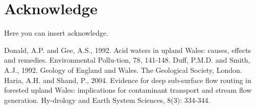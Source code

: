 \documentclass[12pt,a4paper,twocolumn,fleqn]{narms}
\begin{document}
\section{Acknowledge}

Here you can insert acknowledge.

\begin{thebibliography}{9}
\bibitem{} Donald, A.P. and Gee, A.S., 1992.  Acid waters in upland Wales: causes, effects and remedies. Environmental Pollu-tion, 78, 141-148.
\bibitem{} Duff, P.M.D. and Smith, A.J., 1992. Geology of England and Wales.
The Geological Society, London.
\bibitem{} Haria, A.H. and Shand, P., 2004. Evidence for deep sub-surface flow routing in forested upland Wales: implications for contaminant transport and stream flow generation. Hy-drology and Earth System Sciences, 8(3): 334-344.
\end{thebibliography}
\end{document}
